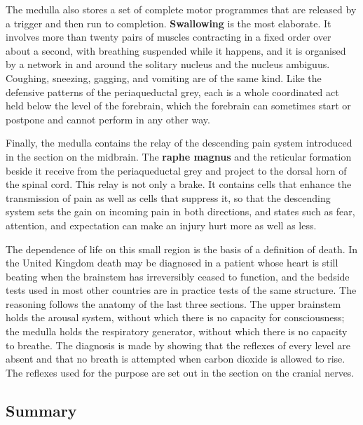 \documentclass[11pt]{article}
\begin{document}
The medulla also stores a set of complete motor programmes that are released by a trigger and then run to completion. \textbf{Swallowing} is the most elaborate. It involves more than twenty pairs of muscles contracting in a fixed order over about a second, with breathing suspended while it happens, and it is organised by a network in and around the solitary nucleus and the nucleus ambiguus. Coughing, sneezing, gagging, and vomiting are of the same kind. Like the defensive patterns of the periaqueductal grey, each is a whole coordinated act held below the level of the forebrain, which the forebrain can sometimes start or postpone and cannot perform in any other way.

Finally, the medulla contains the relay of the descending pain system introduced in the section on the midbrain. The \textbf{raphe magnus} and the reticular formation beside it receive from the periaqueductal grey and project to the dorsal horn of the spinal cord. This relay is not only a brake. It contains cells that enhance the transmission of pain as well as cells that suppress it, so that the descending system sets the gain on incoming pain in both directions, and states such as fear, attention, and expectation can make an injury hurt more as well as less.

The dependence of life on this small region is the basis of a definition of death. In the United Kingdom death may be diagnosed in a patient whose heart is still beating when the brainstem has irreversibly ceased to function, and the bedside tests used in most other countries are in practice tests of the same structure. The reasoning follows the anatomy of the last three sections. The upper brainstem holds the arousal system, without which there is no capacity for consciousness; the medulla holds the respiratory generator, without which there is no capacity to breathe. The diagnosis is made by showing that the reflexes of every level are absent and that no breath is attempted when carbon dioxide is allowed to rise. The reflexes used for the purpose are set out in the section on the cranial nerves.

\subsection{Summary}
\end{document}
